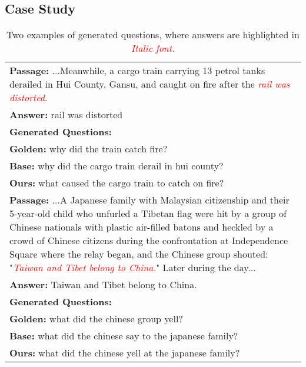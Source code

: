 \documentclass[11pt]{article}
\begin{document}
\subsection{Case Study}
\begin{table}[t]
\small
\centering
\begin{tabular}{@{}l@{}}
\toprule
\multicolumn{1}{p{0.45\textwidth}}{\textbf{Passage:} ...Meanwhile, a cargo train carrying 13 petrol tanks derailed in Hui County, Gansu, and caught on fire after the \textcolor{red}{\textit{rail was distorted}}.}\\
\multicolumn{1}{l}{\textbf{Answer:} rail was distorted} \\
\multicolumn{1}{l}{\textbf{Generated Questions:}} \\
\multicolumn{1}{l}{\textbf{Golden:} why did the train catch fire?}\\
\multicolumn{1}{l}{\textbf{Base:} why did the cargo train derail in hui county?} \\
\multicolumn{1}{l}{\textbf{Ours:} what caused the cargo train to catch on fire?}
 \\ \midrule
\multicolumn{1}{p{0.45\textwidth}}{\textbf{Passage:} ...A Japanese family with Malaysian citizenship and their 5-year-old child who unfurled a Tibetan flag were hit by a group of Chinese nationals with plastic air-filled batons and heckled by a crowd of Chinese citizens during the confrontation at Independence Square where the relay began, and the Chinese group shouted: "\textcolor{red}{\textit{Taiwan and Tibet belong to China.}}" Later during the day...}\\
\multicolumn{1}{l}{\textbf{Answer:} Taiwan and Tibet belong to China.
} \\
\multicolumn{1}{l}{\textbf{Generated Questions:}} \\
\multicolumn{1}{l}{\textbf{Golden:} what did the chinese group yell?} \\
\multicolumn{1}{l}{\textbf{Base:} what did the chinese say to the japanese family?} \\
\multicolumn{1}{l}{\textbf{Ours:} what did the chinese yell at the japanese family?} \\
\bottomrule
\end{tabular}
\caption{Two examples of generated questions, where answers are highlighted in \textcolor{red}{\textit{Italic font.}}}
\label{table-case-study}
\end{table}
\end{document}
